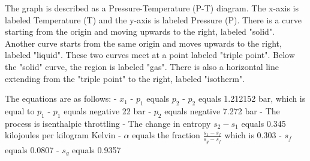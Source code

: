 The graph is described as a Pressure-Temperature (P-T) diagram. The x-axis is labeled Temperature (T) and the y-axis is labeled Pressure (P). There is a curve starting from the origin and moving upwards to the right, labeled "solid". Another curve starts from the same origin and moves upwards to the right, labeled "liquid". These two curves meet at a point labeled "triple point". Below the "solid" curve, the region is labeled "gas". There is also a horizontal line extending from the "triple point" to the right, labeled "isotherm".

The equations are as follows:
- \( x_1 \)
- \( p_1 \) equals \( p_2 \)
- \( p_2 \) equals 1.212152 bar, which is equal to \( p_1 \)
- \( p_1 \) equals negative 22 bar
- \( p_2 \) equals negative 7.272 bar
- The process is isenthalpic throttling
- The change in entropy \( s_2 - s_1 \) equals 0.345 kilojoules per kilogram Kelvin
- \( \alpha \) equals the fraction \(\frac{s_1 - s_f}{s_g - s_f}\) which is 0.303
- \( s_f \) equals 0.0807
- \( s_g \) equals 0.9357